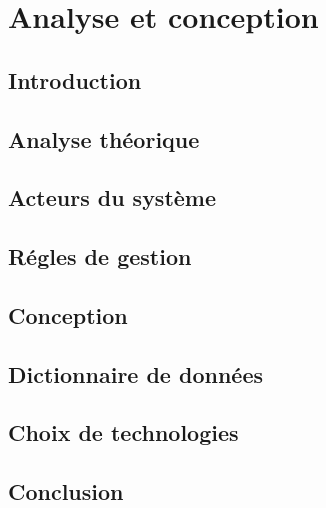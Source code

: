 \chapter{Analyse et conception}



\section{Introduction}

\section{Analyse théorique}

\section{Acteurs du système}

\section{Régles de gestion}

\section{Conception}

\section{Dictionnaire de données}

\section{Choix de technologies}

\section{Conclusion}